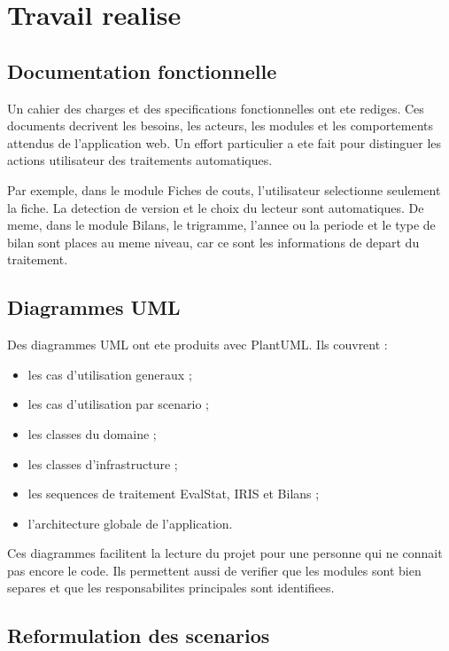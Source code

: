 \documentclass[11pt,a4paper]{report}
\begin{document}
\chapter{Travail realise}

\section{Documentation fonctionnelle}

Un cahier des charges et des specifications fonctionnelles ont ete rediges. Ces documents decrivent les besoins, les acteurs, les modules et les comportements attendus de l'application web. Un effort particulier a ete fait pour distinguer les actions utilisateur des traitements automatiques.

Par exemple, dans le module Fiches de couts, l'utilisateur selectionne seulement la fiche. La detection de version et le choix du lecteur sont automatiques. De meme, dans le module Bilans, le trigramme, l'annee ou la periode et le type de bilan sont places au meme niveau, car ce sont les informations de depart du traitement.

\section{Diagrammes UML}

Des diagrammes UML ont ete produits avec PlantUML. Ils couvrent :

\begin{itemize}
  \item les cas d'utilisation generaux ;
  \item les cas d'utilisation par scenario ;
  \item les classes du domaine ;
  \item les classes d'infrastructure ;
  \item les sequences de traitement EvalStat, IRIS et Bilans ;
  \item l'architecture globale de l'application.
\end{itemize}

Ces diagrammes facilitent la lecture du projet pour une personne qui ne connait pas encore le code. Ils permettent aussi de verifier que les modules sont bien separes et que les responsabilites principales sont identifiees.

\section{Reformulation des scenarios}
\end{document}
